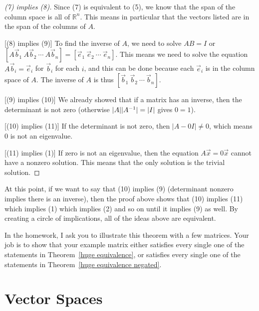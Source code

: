 \begin{proof}
[(7) implies (8)] Since (7) is equivalent to (5), we know that the span of the column space is all of ${\mathbb{R}}^n$. This means in particular that the vectors listed are in the span of the columns of $A$.

[(8) implies (9)]  To find the inverse of $A$, we need to solve $A B = I$ or $[A\vec b_1\ A\vec b_2\ \cdots\ A\vec b_n]=[\vec e_1\ \vec e_2\ \cdots\ \vec e_n]$. This means we need to solve the equation $A\vec b_i=\vec e_i$ for $\vec b_i$ for each $i$, and this can be done because each $\vec e_i$ is in the column space of $A$. The inverse of $A$ is thus $[\vec b_1 \ \vec b_2\ \cdots\ \vec b_n]$.

[(9) implies (10)] We already showed that if a matrix has an inverse, then the determinant is not zero (otherwise $|A||A^{-1}|=|I|$ gives $0=1$).

[(10) implies (11)] If the determinant is not zero, then $|A-0 I|\neq 0$, which means $0$ is not an eigenvalue.

[(11) implies (1)] If zero is not an eigenvalue, then the equation $A\vec x = 0\vec x$ cannot have a nonzero solution. This means that the only solution is the trivial solution.  
\end{proof}

At this point, if we want to say that (10) implies (9) (determinant nonzero implies there is an inverse), then the proof above shows that (10) implies (11) which implies (1) which implies (2) and so on until it implies (9) as well.  By creating a circle of implications, all of the ideas above are equivalent.


In the homework, I ask you to illustrate this theorem with a few matrices.  Your job is to show that your example matrix either satisfies every single one of the statements in Theorem~\ref{huge equivalence}, or satisfies every single one of the statements in Theorem~\ref{huge equivalence negated}.




\section{Vector Spaces}

